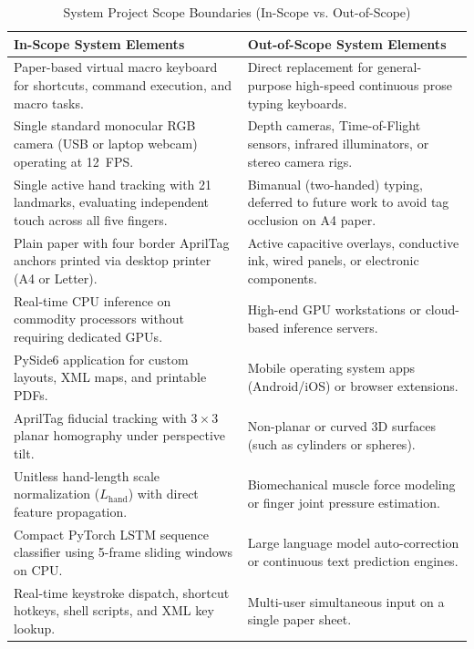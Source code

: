 \begin{table}[H]
\centering
\caption{System Project Scope Boundaries (In-Scope vs. Out-of-Scope)}
\label{tab:project_scope}
\small
\begin{tabular}{p{} p{}}
\toprule
\textbf{In-Scope System Elements} & \textbf{Out-of-Scope System Elements} \\
\midrule
Paper-based virtual macro keyboard for shortcuts, command execution, and macro tasks. & Direct replacement for general-purpose high-speed continuous prose typing keyboards. \\
\addlinespace
Single standard monocular RGB camera (USB or laptop webcam) operating at 12~FPS. & Depth cameras, Time-of-Flight sensors, infrared illuminators, or stereo camera rigs. \\
\addlinespace
Single active hand tracking with 21 landmarks, evaluating independent touch across all five fingers. & Bimanual (two-handed) typing, deferred to future work to avoid tag occlusion on A4 paper. \\
\addlinespace
Plain paper with four border AprilTag anchors printed via desktop printer (A4 or Letter). & Active capacitive overlays, conductive ink, wired panels, or electronic components. \\
\addlinespace
Real-time CPU inference on commodity processors without requiring dedicated GPUs. & High-end GPU workstations or cloud-based inference servers. \\
\addlinespace
PySide6 application for custom layouts, XML maps, and printable PDFs. & Mobile operating system apps (Android/iOS) or browser extensions. \\
\addlinespace
AprilTag fiducial tracking with $3 \times 3$ planar homography under perspective tilt. & Non-planar or curved 3D surfaces (such as cylinders or spheres). \\
\addlinespace
Unitless hand-length scale normalization ($L_{\text{hand}}$) with direct feature propagation. & Biomechanical muscle force modeling or finger joint pressure estimation. \\
\addlinespace
Compact PyTorch LSTM sequence classifier using 5-frame sliding windows on CPU. & Large language model auto-correction or continuous text prediction engines. \\
\addlinespace
Real-time keystroke dispatch, shortcut hotkeys, shell scripts, and XML key lookup. & Multi-user simultaneous input on a single paper sheet. \\
\bottomrule
\end{tabular}
\end{table}


